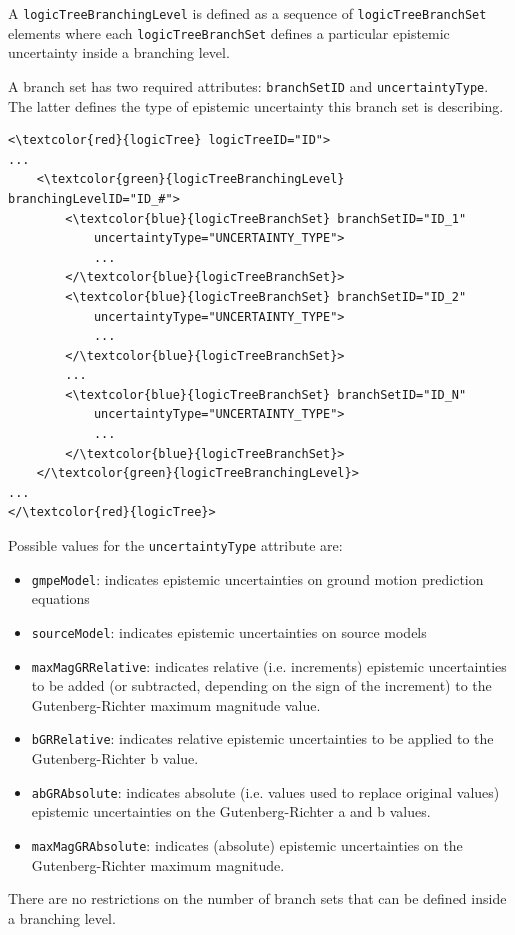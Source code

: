 A \Verb+logicTreeBranchingLevel+ is defined as a sequence of 
\Verb+logicTreeBranchSet+ elements where each \Verb+logicTreeBranchSet+ 
defines a particular epistemic uncertainty inside a branching level.

A branch set has two required attributes: \Verb+branchSetID+ and 
\Verb+uncertaintyType+. The latter defines the type of epistemic uncertainty 
this branch set is describing.
\begin{Verbatim}[frame=single, commandchars=\\\{\}]
<\textcolor{red}{logicTree} logicTreeID="ID">
...
	<\textcolor{green}{logicTreeBranchingLevel} branchingLevelID="ID_#">
		<\textcolor{blue}{logicTreeBranchSet} branchSetID="ID_1"
			uncertaintyType="UNCERTAINTY_TYPE">
			...
		</\textcolor{blue}{logicTreeBranchSet}>
		<\textcolor{blue}{logicTreeBranchSet} branchSetID="ID_2"
			uncertaintyType="UNCERTAINTY_TYPE">
			...
		</\textcolor{blue}{logicTreeBranchSet}>
		...
		<\textcolor{blue}{logicTreeBranchSet} branchSetID="ID_N"
			uncertaintyType="UNCERTAINTY_TYPE">
			...
		</\textcolor{blue}{logicTreeBranchSet}>
	</\textcolor{green}{logicTreeBranchingLevel}>
...
</\textcolor{red}{logicTree}>
\end{Verbatim}
Possible values for the \Verb+uncertaintyType+ attribute are:
\label{list_epistemic_unc}
\begin{itemize}
\item \Verb+gmpeModel+: indicates epistemic uncertainties on ground 
motion prediction equations
\item \Verb+sourceModel+: indicates epistemic uncertainties on source models
\item \Verb+maxMagGRRelative+: indicates relative (i.e. increments)
	epistemic uncertainties to be added (or subtracted, depending on 
	the sign of the increment) to the Guten\-berg-Richter maximum 
	magnitude value.
\item \Verb+bGRRelative+: indicates relative epistemic uncertainties 
	to be applied to the Guten\-berg-Richter b value.
\item \Verb+abGRAbsolute+: indicates absolute (i.e. values used to replace
 	original values) epistemic uncertainties on the 
	Guten\-berg-Richter a and b values.
\item \Verb+maxMagGRAbsolute+: indicates (absolute) epistemic 
	uncertainties on the Guten\-berg-Richter maximum magnitude.
\end{itemize}
There are no restrictions on the number of branch sets that can be defined 
inside a branching level.

